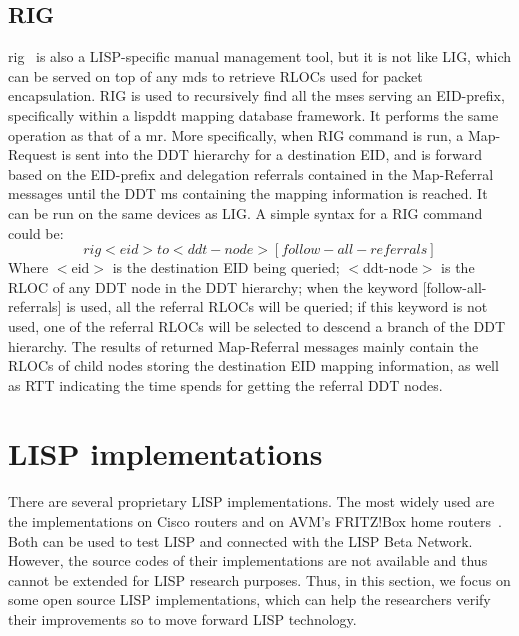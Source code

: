\subsection{RIG}
\label{subsec:implementation_rig}
\acrfull{rig}~\cite{rfc8112} is also a LISP-specific manual management tool, but it is not like LIG, which can be served on top of any \acrshort{mds} to retrieve RLOCs used for packet encapsulation. RIG is used to recursively find all the \acrshort{ms}es serving an EID-prefix, specifically within a \acrshort{lispddt} mapping database framework. It performs the same operation as that of a \acrshort{mr}. More specifically, when RIG command is run, a Map-Request is sent into the DDT hierarchy for a destination EID, and is forward based on the EID-prefix and delegation referrals contained in the Map-Referral messages until the DDT \acrshort{ms} containing the mapping information is reached. It can be run on the same devices as LIG. A simple syntax for a RIG command could be:
\begin{equation}
rig <eid> to <ddt-node> [follow-all-referrals] \nonumber
\end{equation}
Where $<$eid$>$ is the destination EID being queried; $<$ddt-node$>$ is the RLOC of any DDT node in the DDT hierarchy; when the keyword $[$follow-all-referrals$]$ is used, all the referral RLOCs will be queried; if this keyword is not used, one of the referral RLOCs will be selected to descend a branch of the DDT hierarchy. The results of returned Map-Referral messages mainly contain the RLOCs of child nodes storing the destination EID mapping information, as well as RTT indicating the time spends for getting the referral DDT nodes.


\section{LISP implementations}
\label{sec:implementation}
There are several proprietary LISP implementations. The most widely used are the implementations on Cisco routers and on AVM's FRITZ!Box home routers~\cite{AVMFritzBox}. Both can be used to test LISP and connected with the LISP Beta Network. However, the source codes of their implementations are not available and thus cannot be extended for LISP research purposes. Thus, in this section, we focus on some open source LISP implementations, which can help the researchers verify their improvements so to move forward LISP technology.


